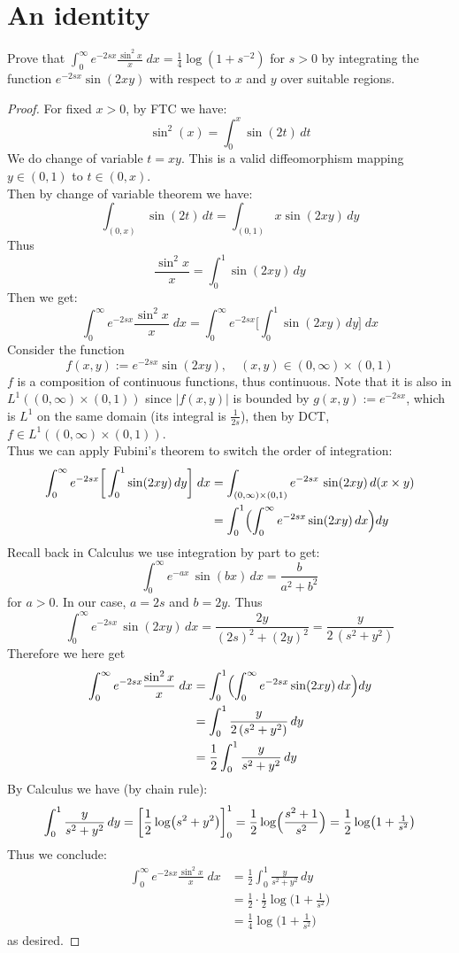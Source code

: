 \documentclass[lang=cn,11pt]{elegantbook}
\begin{document}
\section{An identity}
  Prove that $\int_0^\infty e^{-2sx}\frac{\sin^2x}{x}\;d x=\frac14\log(1+s^{-2})$ for $s>0$ by integrating the function $e^{-2sx}\sin(2xy)$ with respect to $x$ and $y$ over suitable regions.
\begin{proof}
For fixed $x> 0$, by FTC we have:   \[\sin^2 (x)  = \int_0^x \sin(2t)\,dt\]
We do change of variable \(t = xy\). This is a valid diffeomorphism mapping $y\in (0,1)$ to $t \in (0,x)$.\\
Then by change of variable theorem we have: \[\int_{(0,x)} \sin(2t)\,dt = \int_{(0,1)}  x\sin(2xy)\,dy\]Thus \[
\frac{\sin^2 x}{x} = 
\int_0^1 \sin(2xy)\,dy
\]
Then we get: \[
\int_0^\infty e^{-2sx}\frac{\sin^2x}{x}\;d x = \int_0^\infty e^{-2sx}\bigg[\int_0^1 \sin(2xy)\,dy\bigg]\;d x
\]
Consider the function \[
f(x,y) := e^{-2sx}\sin(2xy),\quad (x,y) \in (0,\infty) \times (0,1)
\]
$f$ is a composition of continuous functions, thus continuous. Note that it is also in $L^1( (0,\infty) \times (0,1))$ since $|f(x,y)|$ is bounded by $g (x,y):= e^{-2sx}$, which is $L^1$ on the same domain (its integral is $\frac{1}{2s}$), then by DCT, $f \in L^1( (0,\infty) \times (0,1))$.\\
Thus we can apply Fubini's theorem to switch the order of integration: \begin{align}
    \int_0^\infty e^{-2sx}\bigg[\int_0^1 \sin(2xy)\,dy\bigg]\;d x &= \int_{(0,\infty) \times (0,1)} e^{-2sx}\,\sin(2xy)\,d (x\times y) \\
    &= \int_0^1 
\Bigl(\int_0^\infty e^{-2 s x} \sin(2xy)\,dx\Bigr)dy
\end{align}
Recall back in Calculus we use integration by part to get: \[
\int_0^\infty e^{-a x}\,\sin(b x)\,dx= 
\frac{b}{a^2 + b^2}
\]
for \(a>0\).  In our case, \(a = 2s\) and \(b = 2y\).
Thus \[
\int_0^\infty e^{-2 s x}\,\sin(2xy)\,dx =
\frac{2y}{(2s)^2 + (2y)^2} = 
\frac{y}{2\,(s^2 + y^2)}
\]
Therefore we here get \begin{align}
    \int_0^\infty e^{-2sx}\frac{\sin^2x}{x}\;d x  & =\int_0^1 
\Bigl(\int_0^\infty e^{-2 s x} \sin(2xy)\,dx\Bigr)dy\\
    &= \int_0^1 \frac{y}{2\,(s^2 + y^2)} \, dy \\
    & = \frac{1}{2 } \int_0^1 \frac{y}{s^2 + y^2} \, dy 
\end{align}
By Calculus we have (by chain rule): \[
\int_0^1 \frac{y}{s^2 + y^2}\,dy  =     \bigg[   \frac{1}{2}\log \bigl(s^2 + y^2\bigr)\bigg]_0^1  = \frac{1}{2}
\log\Bigl(\frac{s^2 + 1}{s^2}\Bigr) = 
\frac{1}{2}\log \bigl(1 + \tfrac1{s^2}\bigr)
\]
Thus we conclude: 
\begin{align}
    \int_0^\infty e^{-2sx}\frac{\sin^2x}{x}\;d x  &= \frac{1}{2 } \int_0^1 \frac{y}{s^2 + y^2} \, dy\\ &= \frac{1}{2} \cdot \frac{1}{2}\log \bigl(1 + \tfrac1{s^2}\bigr) \\
    &= \frac{1}{4}\log \bigl(1 + \tfrac1{s^2}\bigr)
\end{align}
as desired. 
\end{proof}
\end{document}
